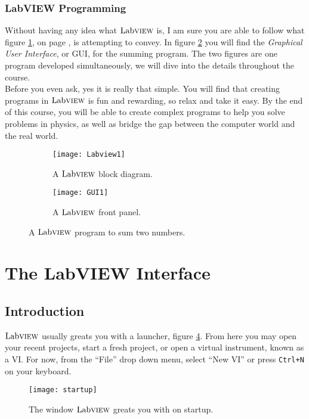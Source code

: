 	\subsubsection{LabVIEW Programming}
	Without having any idea what $\text{Lab}\textsc{view}$ is, I am sure you are able to follow what figure \ref{Labview1}, on page \pageref{Labview1}, is attempting to convey. In figure \ref{GUI1}  you will find the \textit{Graphical User Interface}, or GUI, for the summing program. The two figures are one program developed simultaneously, we will dive into the details throughout the course.\\
	
	Before you even ask, yes it is really that simple. You will find that creating programs in $\text{Lab}\textsc{view}$ is fun and rewarding, so relax and take it easy. By the end of this course, you will be able to create complex programs to help you solve problems in physics, as well as bridge the gap between the computer world and the real world.
	\begin{figure}
		\centering
		\begin{subfigure}[b]{0.49\textwidth}
			\centering
			\texttt{[image: Labview1]}
			\caption{A $\text{Lab}\textsc{view}$ block diagram.}
			\label{Labview1}
		\end{subfigure}
	\hfill
		\begin{subfigure}[b]{0.49\textwidth}
			\centering
			\texttt{[image: GUI1]}
			\caption{A $\text{Lab}\textsc{view}$ front panel.}
			\label{GUI1}
	\end{subfigure}
		\caption{A $\text{Lab}\textsc{view}$ program to sum two numbers.}
		\label{Labview1s}
	\end{figure}

	\section{The LabVIEW Interface}
	\subsection{Introduction}
	$\text{Lab}\textsc{view}$ usually greats you with a launcher, figure \ref{startup}. From here you may open your recent projects, start a fresh project, or open a virtual instrument, known as a VI. For now, from the ``File'' drop down menu, select ``New VI'' or press \texttt{Ctrl+N} on your keyboard.\\
	\begin{figure}
		\centering
		\texttt{[image: startup]}
		\caption{The window $\text{Lab}\textsc{view}$ greats you with on startup.}
		\label{startup}
	\end{figure}

